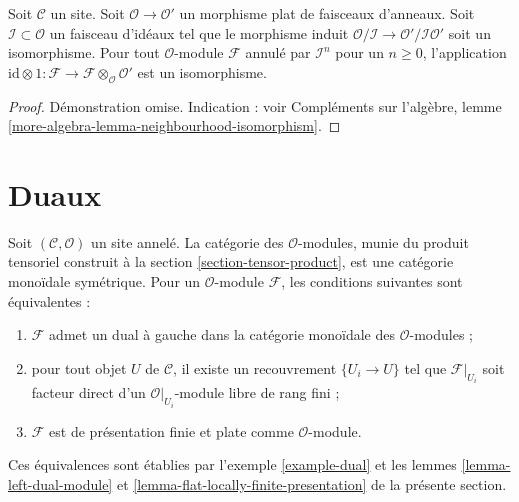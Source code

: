 \begin{lemma}

\label{lemma-neighbourhood-isomorphism}
Soit $\mathcal{C}$ un site. Soit $\mathcal{O} \to \mathcal{O}'$ un
morphisme plat de faisceaux d'anneaux. Soit
$\mathcal{I} \subset \mathcal{O}$ un faisceau d'idéaux tel que le morphisme
induit $\mathcal{O}/\mathcal{I} \to
\mathcal{O}'/\mathcal{I}\mathcal{O}'$ soit un isomorphisme. Pour tout
$\mathcal{O}$-module $\mathcal{F}$ annulé par $\mathcal{I}^n$ pour un
$n \geq 0$, l'application $\text{id} \otimes 1 :
\mathcal{F} \to \mathcal{F} \otimes_\mathcal{O} \mathcal{O}'$ est un isomorphisme.
\end{lemma}

\begin{proof}
Démonstration omise. Indication : voir Compléments sur l'algèbre, lemme
\ref{more-algebra-lemma-neighbourhood-isomorphism}.
\end{proof}





\section{Duaux}

\label{section-duals}

\noindent

Soit $(\mathcal{C}, \mathcal{O})$ un site annelé. La catégorie des
$\mathcal{O}$-modules, munie du produit tensoriel construit à la section
\ref{section-tensor-product}, est une catégorie monoïdale symétrique. Pour
un $\mathcal{O}$-module $\mathcal{F}$, les conditions suivantes sont
équivalentes :

\begin{enumerate}

\item $\mathcal{F}$ admet un dual à gauche dans la catégorie monoïdale des
$\mathcal{O}$-modules ;
\item pour tout objet $U$ de $\mathcal{C}$, il existe un recouvrement
$\{U_i \to U\}$ tel que $\mathcal{F}|_{U_i}$ soit facteur direct d'un
$\mathcal{O}|_{U_i}$-module libre de rang fini ;
\item $\mathcal{F}$ est de présentation finie et plate comme
$\mathcal{O}$-module.

\end{enumerate}

Ces équivalences sont établies par l'exemple \ref{example-dual} et les
lemmes \ref{lemma-left-dual-module} et
\ref{lemma-flat-locally-finite-presentation} de la présente section.

